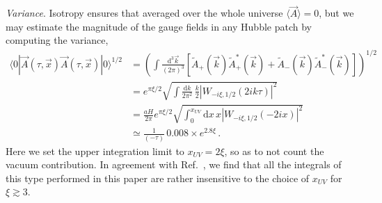 \textit{Variance}. Isotropy ensures that averaged over the whole universe $\langle \vec A \rangle = 0$, but we may estimate the magnitude of the gauge fields in any Hubble patch by computing the variance,
\begin{align}
 \langle 0 | \vec A(\tau, \vec x) \vec A(\tau, \vec x) | 0 \rangle^{1/2} & = \left(\int  \frac{\textrm{d}^3 \vec{k} }{(2\pi)^3}  \left[ \tilde{A}_{+}(\vec{k})  \tilde{A}_{+}^*(\vec{k}) + \tilde{A}_{-}(\vec{k})  \tilde{A}_{-}^*(\vec{k} ) \right] \right)^{1/2} \nonumber \\
 & =  e^{\pi \xi/2} \sqrt{ \int \frac{ \textrm{d} k}{2\pi^2} \, \frac{k}{2} \left| W_{-i\xi,1/2}(2ik\tau)\right|^2 } \nonumber \\
 &  = \frac{aH}{2\pi} e^{\pi \xi/2} \sqrt{ \int_0^{x_{UV}} \textrm{d} x\, x \left|W_{-i\xi,1/2}(- 2 i x)\right|^2 } \nonumber \\
 & \simeq \frac{1}{(-\tau)}\,  0.008 \times e^{2.8 \xi} \,.	 \label{eq:variance_abelian}
\end{align}
Here we set the upper integration limit to $x_{UV} = 2 \xi$, so as to not count the vacuum contribution. In agreement with Ref.~\cite{Jimenez:2017cdr}, we find that all the integrals of this type performed in this paper are rather insensitive to the choice of $x_{UV}$ for $\xi \gtrsim 3$.


